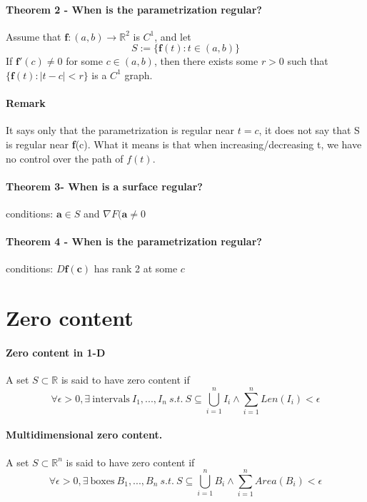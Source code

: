 \documentclass[11pt]{article}
\newcommand{\tb}[1]{\textbf{#1}}
\newcommand{\real}[0]{\mathbb{R}}
\newcommand{\func}[3]{\tb{#1}: {#2} \rightarrow {#3} }
\begin{document}
\paragraph{Theorem 2 - When is the parametrization regular?} 
Assume that $\func{f}{(a, b)}{\real ^2}$ is $C^1$, and let
$$S:=\{ \tb{f}(t): t \in (a, b)\}$$
If $\tb{f}'(c) \neq 0$ for some $c \in (a, b)$, then there exists some $r>0$ such that $\{ \tb{f} (t): |t-c| < r\}$ is a $C^1$ graph. \newline
\paragraph{Remark}
It says only that the parametrization is regular near $t = c$, it does not say that S is regular near \tb{f}(c). What it means is that when increasing/decreasing t, we have no control over the path of $f(t)$.
\paragraph{Theorem 3- When is a surface regular?}
conditions: $\tb{a} \in S$ and $\nabla F(\tb{a} \neq 0$
\paragraph{Theorem 4 - When is the parametrization regular?}
conditions: $D\tb{f}(\tb{c})$ has rank 2 at some $c$

\section{Zero content}
\paragraph{Zero content in 1-D} A set $S\subset \real$ is said to have zero content if
\begin{equation*}
    \forall \epsilon > 0, \exists~\text{intervals}~I_1,...,I_n ~s.t.~ S\subseteq \bigcup_{i=1}^{n}I_i \wedge \sum_{i=1}^{n}{Len(I_i)} < \epsilon
\end{equation*}

\paragraph{Multidimensional zero content.} A set $S\subset \real^n$ is said to have zero content if
\begin{equation*}
    \forall \epsilon > 0, \exists~\text{boxes}~B_1,...,B_n~s.t.~S\subseteq \bigcup_{i=1}^{n}B_i \wedge \sum_{i=1}^{n}{Area(B_i)} < \epsilon
\end{equation*}
\end{document}
